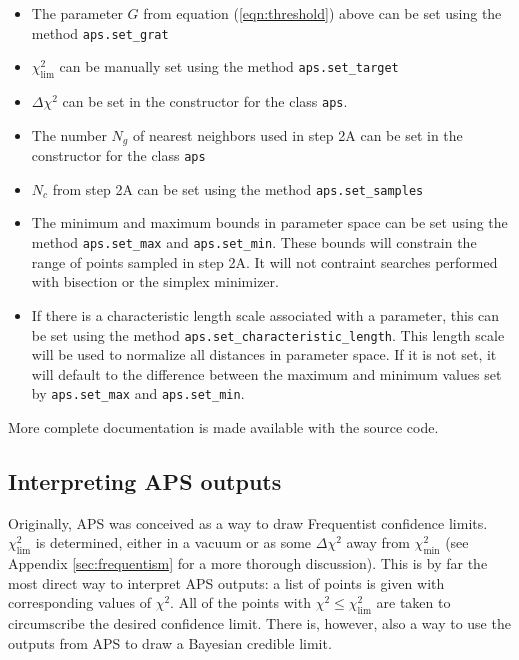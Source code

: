 \documentclass[useAMS,usenatbib]{aastex}
\begin{document}
\begin{itemize}
\item The parameter $G$ from equation (\ref{eqn:threshold}) above can be set using the method
\verb|aps.set_grat|
\\
\item $\chi^2_\text{lim}$ can be manually set using the method \verb|aps.set_target|
\\
\item $\Delta \chi^2$ can be set in the constructor for the class \verb|aps|.
\\
\item The number $N_g$ of nearest neighbors used in step 2A can be set in the constructor
for the class \verb|aps|
\\
\item $N_c$ from step 2A can be set using the method \verb|aps.set_samples|
\\
\item The minimum and maximum bounds in parameter space can be set using the 
method \verb|aps.set_max| and \verb|aps.set_min|.  These bounds will constrain the range of
points sampled in step 2A.  It will not contraint searches performed with bisection or the 
simplex minimizer.
\\
\item If there is a characteristic length scale associated with a parameter, this can be set
using the method \verb|aps.set_characteristic_length|.  This length scale will be used to
normalize all distances in parameter space.  If it is not set, it will default to the
difference between the maximum and minimum values set by \verb|aps.set_max| and
\verb|aps.set_min|.
\end{itemize}

More complete documentation is made available with the source code.

\subsection{Interpreting APS outputs}
\label{sec:bayes}

Originally, APS was conceived as a way to draw Frequentist confidence limits. 
$\chi^2_\text{lim}$ is determined, either in a vacuum or as some $\Delta\chi^2$ away from
$\chi^2_\text{min}$ (see Appendix \ref{sec:frequentism} for a more thorough discussion).
This is by far the most direct way to interpret APS outputs: a list of points is given with
corresponding values of $\chi^2$.  All of the points with $\chi^2\le\chi^2_\text{lim}$ are
taken to circumscribe the desired confidence limit.  There is, however, also a way to use the
outputs from APS to draw a Bayesian credible limit.
\end{document}
